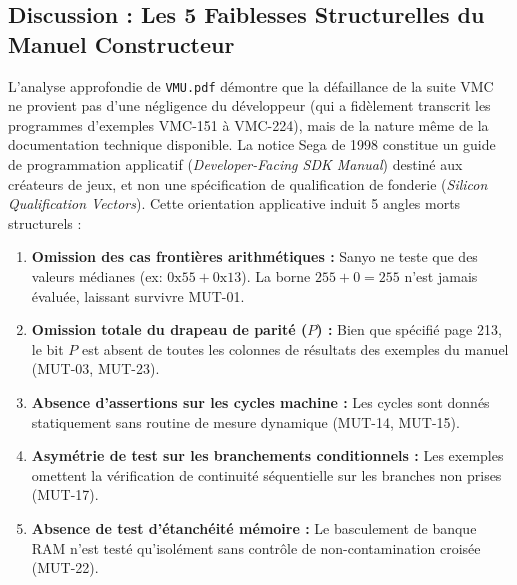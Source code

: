 \documentclass[10pt,journal,compsoc]{IEEEtran}
\begin{document}
\subsection{Discussion : Les 5 Faiblesses Structurelles du Manuel Constructeur}
L'analyse approfondie de \texttt{VMU.pdf} démontre que la défaillance de la suite VMC ne provient pas d'une négligence du développeur (qui a fidèlement transcrit les programmes d'exemples VMC-151 à VMC-224), mais de la nature même de la documentation technique disponible. La notice Sega de 1998 constitue un guide de programmation applicatif (\textit{Developer-Facing SDK Manual}) destiné aux créateurs de jeux, et non une spécification de qualification de fonderie (\textit{Silicon Qualification Vectors}). Cette orientation applicative induit 5 angles morts structurels :
\begin{enumerate}
    \item \textbf{Omission des cas frontières arithmétiques :} Sanyo ne teste que des valeurs médianes (ex: $0\text{x55} + 0\text{x13}$). La borne $255 + 0 = 255$ n'est jamais évaluée, laissant survivre MUT-01.
    \item \textbf{Omission totale du drapeau de parité ($P$) :} Bien que spécifié page 213, le bit $P$ est absent de toutes les colonnes de résultats des exemples du manuel (MUT-03, MUT-23).
    \item \textbf{Absence d'assertions sur les cycles machine :} Les cycles sont donnés statiquement sans routine de mesure dynamique (MUT-14, MUT-15).
    \item \textbf{Asymétrie de test sur les branchements conditionnels :} Les exemples omettent la vérification de continuité séquentielle sur les branches non prises (MUT-17).
    \item \textbf{Absence de test d'étanchéité mémoire :} Le basculement de banque RAM n'est testé qu'isolément sans contrôle de non-contamination croisée (MUT-22).
\end{enumerate}
\end{document}
